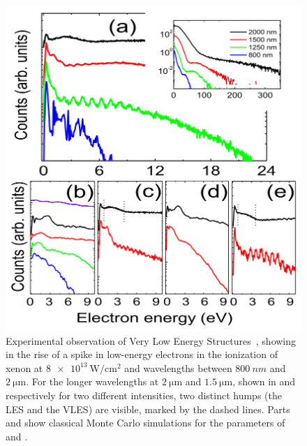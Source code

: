 \begin{figure}[t!]
  \centering
  \subfloat{\label{f6-quan-original-figure-a}}
  \subfloat{\label{f6-quan-original-figure-b}}
  \subfloat{\label{f6-quan-original-figure-c}}
  \subfloat{\label{f6-quan-original-figure-d}}
  \subfloat{\label{f6-quan-original-figure-e}}
  \includegraphics[scale=0.8]{6-LES/Figures/figure6B.png}
  \caption[
  Experimental observation of Very Low Enegy Structures by W. Quan et al.
  ]{
  Experimental observation of Very Low Energy Structures~\cite{VLES_initial}, showing in \protect{} the rise of a spike in low-energy electrons in the ionization of xenon at $\SI{8e13}{\watt/\centi\meter^2}$ and wavelengths between $\SI{800}{nm}$ and $\SI{2}{\micro\meter}$. For the longer wavelengths at $\SI{2}{\micro\meter}$ and $\SI{1.5}{\micro\meter}$, shown in \protect{} and \protect{} respectively for two different intensities, two distinct humps (the LES and the VLES) are visible, marked by the dashed lines.  
  Parts \protect{} and \protect{} show classical Monte Carlo simulations for the parameters of \protect{} and \protect{}.
}
\end{figure}
